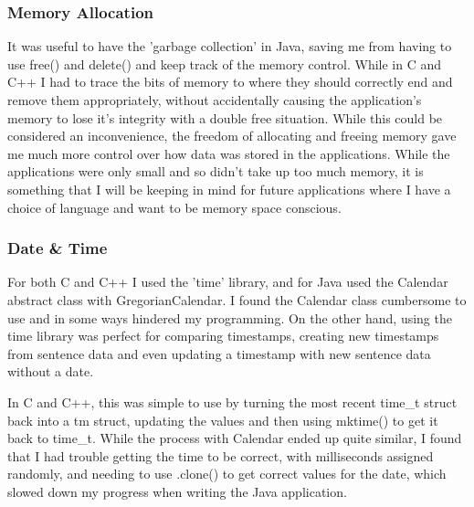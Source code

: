 \documentclass{article}
\begin{document}
\subsubsection{Memory Allocation}

It was useful to have the 'garbage collection' in Java, saving me from having to use free() and delete() and keep track of the memory control. While in C and C++ I had to trace the bits of memory to where they should correctly end and remove them appropriately, without accidentally causing the application's memory to lose it's integrity with a double free situation. While this could be considered an inconvenience, the freedom of allocating and freeing memory gave me much more control over how data was stored in the applications. While the applications were only small and so didn't take up too much memory, it is something that I will be keeping in mind for future applications where I have a choice of language and want to be memory space conscious.

\subsubsection{Date \& Time}

For both C and C++ I used the 'time' library\cite{ctime}, and for Java used the Calendar\cite{calendar} abstract class with GregorianCalendar\cite{gregcalendar}. I found the Calendar class cumbersome to use and in some ways hindered my programming. On the other hand, using the time library was perfect for comparing timestamps, creating new timestamps from sentence data and even updating a timestamp with new sentence data without a date.

In C and C++, this was simple to use by turning the most recent time\_t struct back into a tm struct, updating the values and then using mktime() to get it back to time\_t. While the process with Calendar ended up quite similar, I found that I had trouble getting the time to be correct, with milliseconds assigned randomly, and needing to use .clone() to get correct values for the date, which slowed down my progress when writing the Java application.







\end{document}
